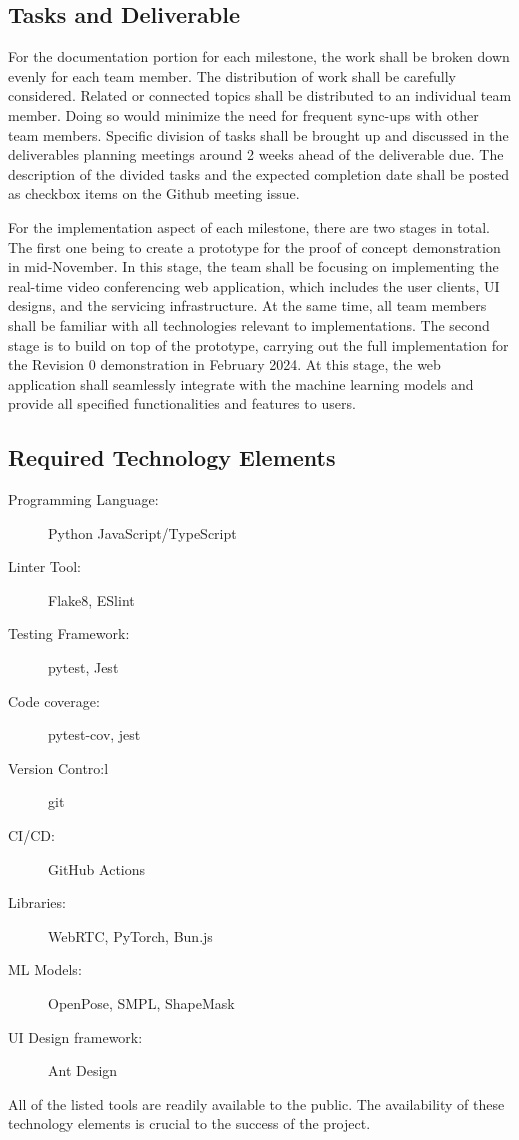 \documentclass[12pt]{article}
\begin{document}
\subsection{Tasks and Deliverable}
For the documentation portion for each milestone, the work shall be broken down evenly for each team member. The distribution of work shall be carefully considered. Related or connected topics shall be distributed to an individual team member. Doing so would minimize the need for frequent sync-ups with other team members. Specific division of tasks shall be brought up and discussed in the deliverables planning meetings around 2 weeks ahead of the deliverable due. The description of the divided tasks and the expected completion date shall be posted as checkbox items on the Github meeting issue.

For the implementation aspect of each milestone, there are two stages in total. The first one being to create a prototype for the proof of concept demonstration in mid-November. In this stage, the team shall be focusing on implementing the real-time video conferencing web application, which includes the user clients, UI designs, and the servicing infrastructure. At the same time, all team members shall be familiar with all technologies relevant to implementations. The second stage is to build on top of the prototype, carrying out the full implementation for the Revision 0 demonstration in February 2024. At this stage, the web application shall seamlessly integrate with the machine learning models and provide all specified functionalities and features to users.

\subsection{Required Technology Elements}
\begin{description}
\item[Programming Language:] Python JavaScript/TypeScript
\item[Linter Tool:] Flake8, ESlint
\item[Testing Framework:] pytest, Jest
\item[Code coverage:] pytest-cov, jest
\item[Version Contro:l] git
\item[CI/CD:] GitHub Actions
\item[Libraries:] WebRTC, PyTorch, Bun.js
\item[ML Models:] OpenPose, SMPL, ShapeMask
\item[UI Design framework:] Ant Design
\end{description}
All of the listed tools are readily available to the public. The availability of these technology elements is crucial to the success of the project.
\end{document}
